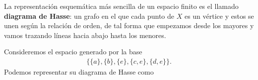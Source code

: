 La representación esquemática  más sencilla de un espacio finito es el llamado \textbf{diagrama de Hasse}: un grafo en el que cada punto de $X$ es un vértice y estos se unen según la relación de orden, de tal forma que empezamos desde los mayores y vamos trazando líneas hacia abajo hasta los menores.
\begin{example}
  Consideremos el espacio generado por la base 
  \begin{gather*}
      \{\{a\},\{b\},\{e\},\{c,e\},\{d,e\}\}.
  \end{gather*}
  Podemos representar su diagrama de Hasse como


\begin{figure}[h]
\begin{tikzpicture}[x=0.75pt,y=0.75pt,yscale=-1,xscale=1]


\end{tikzpicture}
\end{figure}
\end{example}
